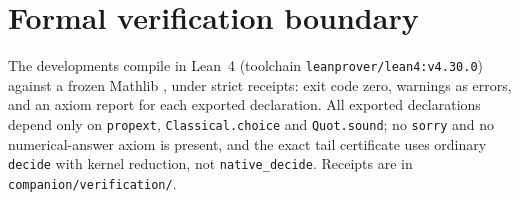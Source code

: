 \documentclass[11pt]{article}
\theoremstyle{plain}
\theoremstyle{definition}
\theoremstyle{remark}
\begin{document}
\section{Formal verification boundary}\label{sec:lean}

The developments compile in Lean~4 \cite{demoura2021} (toolchain
\texttt{leanprover/lean4:v4.30.0}) against a frozen Mathlib
\cite{mathlib2020}, under strict receipts: exit code
zero, warnings as errors, and an axiom report for each exported declaration.
All exported declarations depend only on \texttt{propext},
\texttt{Classical.choice} and \texttt{Quot.sound}; no \texttt{sorry} and no
numerical-answer axiom is present, and the exact tail certificate uses
ordinary \texttt{decide} with kernel reduction, not \texttt{native\_decide}.
Receipts are in \texttt{companion/verification/}.
\end{document}
